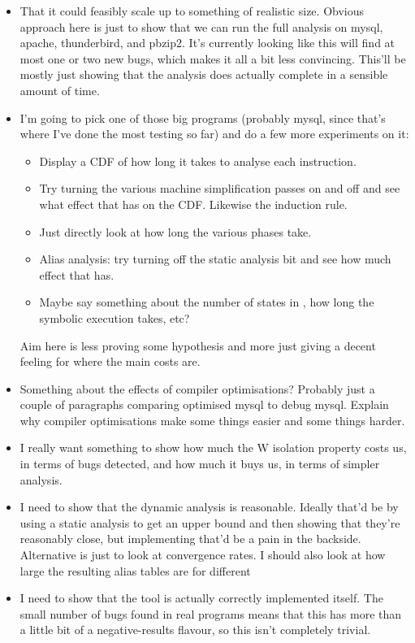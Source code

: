 \begin{itemize}
\item That it could feasibly scale up to something of realistic size.
  Obvious approach here is just to show that we can run the full
  analysis on mysql, apache, thunderbird, and pbzip2.  It's currently
  looking like this will find at most one or two new bugs, which makes
  it all a bit less convincing.  This'll be mostly just showing that
  the analysis does actually complete in a sensible amount of time.
\item I'm going to pick one of those big programs (probably mysql,
  since that's where I've done the most testing so far) and do a few
  more experiments on it:

  \begin{itemize}
  \item Display a CDF of how long it takes to analyse each instruction.
  \item Try turning the various machine simplification passes on and
    off and see what effect that has on the CDF.  Likewise the
    induction rule.
  \item Just directly look at how long the various phases take.
  \item Alias analysis: try turning off the static analysis bit and
    see how much effect that has.
  \item Maybe say something about the number of states in
    {\StateMachines}, how long the symbolic execution takes, etc?
  \end{itemize}

  Aim here is less proving some hypothesis and more just giving a
  decent feeling for where the main costs are.
\item Something about the effects of compiler optimisations?  Probably
  just a couple of paragraphs comparing optimised mysql to debug
  mysql.  Explain why compiler optimisations make some things easier
  and some things harder.
\item I really want something to show how much the W isolation
  property costs us, in terms of bugs detected, and how much it buys
  us, in terms of simpler analysis.
\item I need to show that the dynamic analysis is reasonable.  Ideally
  that'd be by using a static analysis to get an upper bound and then
  showing that they're reasonably close, but implementing that'd be a
  pain in the backside.  Alternative is just to look at convergence
  rates.  I should also look at how large the resulting alias tables
  are for different 
\item I need to show that the tool is actually correctly implemented
  itself.  The small number of bugs found in real programs means that
  this has more than a little bit of a negative-results flavour, so
  this isn't completely trivial.
\end{itemize}

